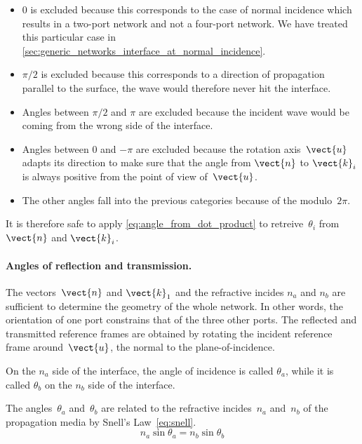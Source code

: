 \begin{itemize}
    \item 0 is excluded because this corresponds to the case of normal incidence which results in a two-port network and not a four-port network.  We have treated this particular case in \vref{sec:generic_networks_interface_at_normal_incidence}.
    \item $\pi/2$ is excluded because this corresponds to a direction of propagation parallel to the surface, the wave would therefore never hit the interface.
    \item Angles between $\pi/2$ and $\pi$ are excluded because the incident wave would be coming from the wrong side of the interface.
    \item Angles between 0 and $-\pi$ are excluded because the rotation axis~$\vect{u}$ adapts its direction to make sure that the angle from $\vect{n}$ to $\vect{k}_i$ is always positive from the point of view of~$\vect{u}$.
    \item The other angles fall into the previous categories because of the modulo~$2\pi$.
\end{itemize}
It is therefore safe to apply \cref{eq:angle_from_dot_product} to retreive~$\theta_i$ from $\vect{n}$ and $\vect{k}_i$.


\paragraph{Angles of reflection and transmission.}
The vectors~$\vect{n}$ and $\vect{k}_1$ and the refractive incides $n_a$ and $n_b$ are sufficient to determine the geometry of the whole network.
In other words, the orientation of one port constrains that of the three other ports.
The reflected and transmitted reference frames are obtained by rotating the incident reference frame around~$\vect{u}$, the normal to the plane-of-incidence.

On the $n_a$ side of the interface, the angle of incidence is called $\theta_a$, while it is called $\theta_b$ on the $n_b$ side of the interface.

The angles~$\theta_a$ and~$\theta_b$ are related to the refractive incides~$n_a$ and~$n_b$ of the propagation media by Snell's Law~\eqref{eq:snell}.
\begin{equation}
    n_a \sin \theta_a = n_b \sin \theta_b
    \label{eq:snell}
\end{equation}

